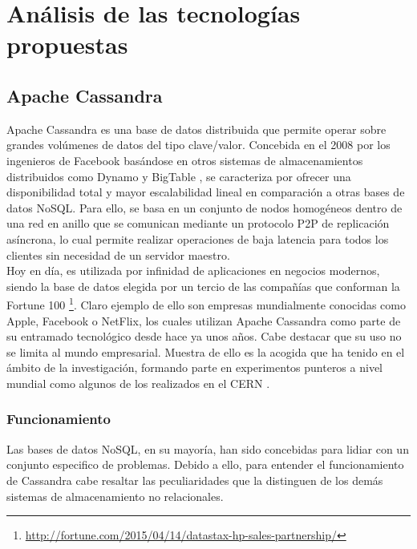 
\pagestyle{fancy}

\chapter{Análisis de las tecnologías propuestas}
\label{analisis_tecnologias}

\section{Apache Cassandra}

Apache Cassandra es una base de datos distribuida que permite operar sobre grandes volúmenes de datos del tipo clave/valor. Concebida en el 2008 por los ingenieros de Facebook basándose en otros sistemas de almacenamientos distribuidos como Dynamo\cite{decandia2007dynamo} y BigTable \cite{chang2008bigtable}, se caracteriza por ofrecer una  disponibilidad total y mayor escalabilidad lineal en comparación a otras bases de datos NoSQL\cite{nambiartowards}.  Para ello, se basa en un conjunto de nodos homogéneos dentro de una red en anillo que se comunican mediante un protocolo P2P de replicación asíncrona, lo cual permite realizar operaciones de baja latencia para todos los clientes sin necesidad de un servidor maestro.\\

Hoy en día, es utilizada por infinidad de aplicaciones en negocios modernos, siendo la base de datos elegida por un tercio de las compañías que conforman la Fortune 100 \footnote{\url{http://fortune.com/2015/04/14/datastax-hp-sales-partnership/}}. Claro ejemplo de ello son empresas mundialmente conocidas como Apple, Facebook o NetFlix, los cuales utilizan Apache Cassandra como parte de su entramado tecnológico desde hace ya unos años. Cabe destacar que su uso no se limita al mundo empresarial. Muestra de ello es la acogida que ha tenido en el ámbito de la investigación, formando parte en experimentos punteros a nivel mundial como algunos de los realizados en el CERN \cite{sicoe2012persistent}.\\

\subsection{Funcionamiento}

Las bases de datos NoSQL, en su mayoría, han sido concebidas para lidiar con un conjunto especifico de problemas. Debido a ello, para entender el funcionamiento de Cassandra cabe resaltar las peculiaridades que la distinguen de los demás sistemas de almacenamiento no relacionales.

